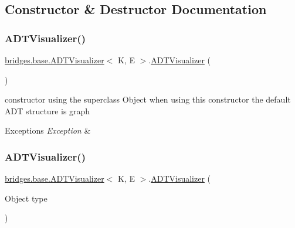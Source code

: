 \subsection{Constructor \& Destructor Documentation}
\hypertarget{classbridges_1_1base_1_1_a_d_t_visualizer_a3d5098e4c0609c19a547f19f0d538eeb}{}\label{classbridges_1_1base_1_1_a_d_t_visualizer_a3d5098e4c0609c19a547f19f0d538eeb} 
\subsubsection{\texorpdfstring{A\+D\+T\+Visualizer()}{ADTVisualizer()}\hspace{0.1cm}{\footnotesize\ttfamily [1/2]}}
{\footnotesize\ttfamily \hyperlink{classbridges_1_1base_1_1_a_d_t_visualizer}{bridges.\+base.\+A\+D\+T\+Visualizer}$<$ K, E $>$.\hyperlink{classbridges_1_1base_1_1_a_d_t_visualizer}{A\+D\+T\+Visualizer} (\begin{DoxyParamCaption}{ }\end{DoxyParamCaption})}

constructor using the superclass Object when using this constructor the default A\+DT structure is graph 
\begin{DoxyExceptions}{Exceptions}
{\em Exception} & \\
\hline
\end{DoxyExceptions}
\hypertarget{classbridges_1_1base_1_1_a_d_t_visualizer_af722d7ea9506b1ca8119ae39c43130ff}{}\label{classbridges_1_1base_1_1_a_d_t_visualizer_af722d7ea9506b1ca8119ae39c43130ff} 
\subsubsection{\texorpdfstring{A\+D\+T\+Visualizer()}{ADTVisualizer()}\hspace{0.1cm}{\footnotesize\ttfamily [2/2]}}
{\footnotesize\ttfamily \hyperlink{classbridges_1_1base_1_1_a_d_t_visualizer}{bridges.\+base.\+A\+D\+T\+Visualizer}$<$ K, E $>$.\hyperlink{classbridges_1_1base_1_1_a_d_t_visualizer}{A\+D\+T\+Visualizer} (\begin{DoxyParamCaption}\item[{Object}]{type }\end{DoxyParamCaption})}

